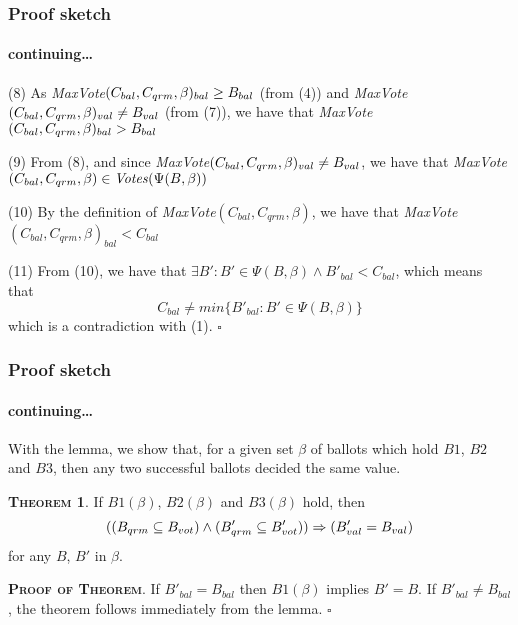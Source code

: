 \documentclass[10 pt]{beamer}
\begin{document}
\begin{frame}
\frametitle{Proof sketch}
\framesubtitle{continuing\ldots}

(8) As \textit{MaxVote}$(C_{bal}, C_{qrm}, \beta)_{bal} \geq B_{bal}$ (from (4)) and \textit{MaxVote}$(C_{bal}, C_{qrm}, \beta)_{val} \neq B_{val}$ (from (7)), we have that \textit{MaxVote}$(C_{bal}, C_{qrm}, \beta)_{bal} > B_{bal}$

\vspace{2 mm}
(9) From (8), and since \textit{MaxVote}$(C_{bal}, C_{qrm}, \beta)_{val} \neq B_{val}$, we have that \textit{MaxVote}$(C_{bal}, C_{qrm}, \beta) \in \text{\textit{Votes}}(\Psi(B,\beta))$ 

\vspace{2 mm}
(10) By the definition of \textit{MaxVote}$(C_{bal}, C_{qrm}, \beta)$, we have that \textit{MaxVote}$(C_{bal}, C_{qrm}, \beta)_{bal} < C_{bal}$

\vspace{2 mm}
(11) From (10), we have that $\exists B' : B' \in \Psi(B, \beta) \wedge B'_{bal} < C_{bal}$, which means that $$C_{bal} \neq min\{B'_{bal} : B' \in \Psi(B, \beta)\}$$ which is a contradiction with (1). $\square$

\end{frame}



\begin{frame}
\frametitle{Proof sketch}
\framesubtitle{continuing\ldots}

With the lemma, we show that, for a given set $\beta$ of ballots which hold $B1$, $B2$ and $B3$, then any two successful ballots decided the same value.

\vspace{2 mm}
\textbf{\textsc{Theorem 1}}. If $B1(\beta)$, $B2(\beta)$ and $B3(\beta)$ hold, then
$$((B_{qrm} \subseteq B_{vot}) \wedge (B'_{qrm} \subseteq B'_{vot})) \Rightarrow (B'_{val} = B_{val})$$
for any $B$, $B'$ in $\beta$.

\vspace{2 mm}
\textbf{\textsc{Proof of Theorem}}. If $B'_{bal} = B_{bal}$ then $B1(\beta)$ implies $B' = B$. If $B'_{bal} \neq B_{bal}$, the theorem follows immediately from the lemma. $\square$

\end{frame}
\end{document}
